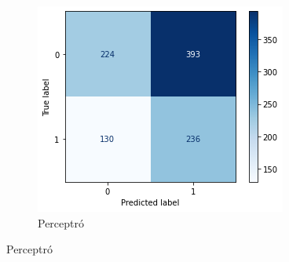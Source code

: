 \documentclass{article}
\begin{document}
\begin{figure}[!h]
\begin{subfigure}[b]{0.25\textwidth}
			\label{fig:three sin x}
		\end{subfigure}
		\hfill
		\begin{subfigure}[b]{0.25\textwidth}
			\centering
			\includegraphics[width=\textwidth]{../images/cmatrix-perceptro}
			\caption*{Perceptró}
			\label{fig:five over x}
		\end{subfigure}
		\label{fig:three graphs}
	\end{figure}
\end{document}
